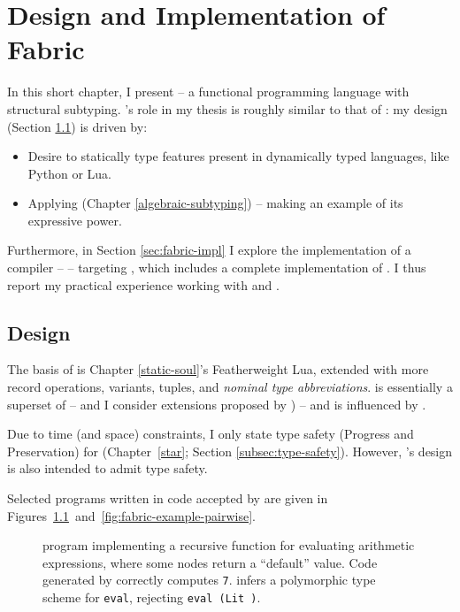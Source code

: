 \chapter{Design and Implementation of Fabric}
\label{fabric}

In this short chapter, I present \textbf{\fabric{}} -- a functional programming language with structural subtyping. 
\fabric{}'s role in my thesis is roughly similar to that of \mlsub{} \cite{dolan-thesis}: my design (Section \ref{sec:fabric-design}) is driven by: \begin{itemize}
    \item Desire to statically type features present in dynamically typed languages, like Python or Lua.
    \item Applying \inference{} (Chapter \ref{algebraic-subtyping}) -- making \fabric{} an example of its expressive power.
\end{itemize}
Furthermore, in Section \ref{sec:fabric-impl} I explore the implementation of a \fabric{} compiler -- \compiler{} -- targeting \wasm{}, which includes a complete implementation of \inference{}. I thus report my practical experience working with \wasm{} and \inference{}.

\section{Design}
\label{sec:fabric-design}

The basis of \fabric{} is Chapter \ref{static-soul}'s Featherweight Lua, extended with more record operations, variants, tuples, and \emph{nominal type abbreviations}. \fabric{} is essentially a superset of \mlsub{} \cite{mlsub} -- and I consider extensions proposed by \textcite{dolan-thesis}) -- and is influenced by \mlstruct{} \cite{mlstruct}.

Due to time (and space) constraints, I only state type safety (Progress and Preservation) for \starr{} (Chapter~\ref{star}; Section \ref{subsec:type-safety}). However, \fabric{}'s design is also intended to admit type safety.

Selected \fabric{} programs written in code accepted by \compiler{} are given in Figures~\ref{fig:fabric-example-eval}~and~\ref{fig:fabric-example-pairwise}.


\begin{figure}[p]
    \centering
    
    \caption{\fabric{} program implementing a recursive function for evaluating arithmetic expressions, where some nodes return a \enquote{default} value. Code generated by \compiler{} correctly computes \texttt{7}. \inference{} infers a polymorphic type scheme for \texttt{eval}, \eg{} rejecting \texttt{eval (Lit {})}.}
    \label{fig:fabric-example-eval}
\end{figure}

